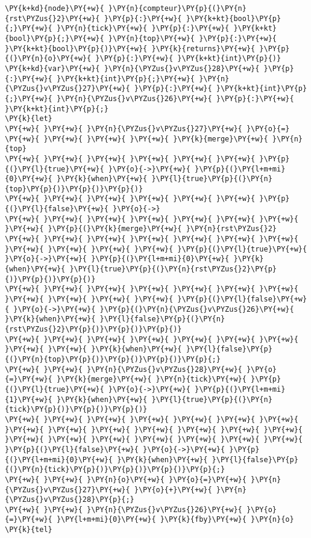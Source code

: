 \begin{Verbatim}[commandchars=\\\{\}]
\PY{k+kd}{node}\PY{+w}{ }\PY{n}{compteur}\PY{p}{(}\PY{n}{rst\PYZus{}2}\PY{+w}{ }\PY{p}{:}\PY{+w}{ }\PY{k+kt}{bool}\PY{p}{;}\PY{+w}{ }\PY{n}{tick}\PY{+w}{ }\PY{p}{:}\PY{+w}{ }\PY{k+kt}{bool}\PY{p}{;}\PY{+w}{ }\PY{n}{top}\PY{+w}{ }\PY{p}{:}\PY{+w}{ }\PY{k+kt}{bool}\PY{p}{)}\PY{+w}{ }\PY{k}{returns}\PY{+w}{ }\PY{p}{(}\PY{n}{o}\PY{+w}{ }\PY{p}{:}\PY{+w}{ }\PY{k+kt}{int}\PY{p}{)}
\PY{k+kd}{var}\PY{+w}{ }\PY{n}{\PYZus{}v\PYZus{}28}\PY{+w}{ }\PY{p}{:}\PY{+w}{ }\PY{k+kt}{int}\PY{p}{;}\PY{+w}{ }\PY{n}{\PYZus{}v\PYZus{}27}\PY{+w}{ }\PY{p}{:}\PY{+w}{ }\PY{k+kt}{int}\PY{p}{;}\PY{+w}{ }\PY{n}{\PYZus{}v\PYZus{}26}\PY{+w}{ }\PY{p}{:}\PY{+w}{ }\PY{k+kt}{int}\PY{p}{;}
\PY{k}{let}
\PY{+w}{ }\PY{+w}{ }\PY{n}{\PYZus{}v\PYZus{}27}\PY{+w}{ }\PY{o}{=}
\PY{+w}{ }\PY{+w}{ }\PY{+w}{ }\PY{+w}{ }\PY{k}{merge}\PY{+w}{ }\PY{n}{top}
\PY{+w}{ }\PY{+w}{ }\PY{+w}{ }\PY{+w}{ }\PY{+w}{ }\PY{+w}{ }\PY{p}{(}\PY{l}{true}\PY{+w}{ }\PY{o}{->}\PY{+w}{ }\PY{p}{(}\PY{l+m+mi}{0}\PY{+w}{ }\PY{k}{when}\PY{+w}{ }\PY{l}{true}\PY{p}{(}\PY{n}{top}\PY{p}{)}\PY{p}{)}\PY{p}{)}
\PY{+w}{ }\PY{+w}{ }\PY{+w}{ }\PY{+w}{ }\PY{+w}{ }\PY{+w}{ }\PY{p}{(}\PY{l}{false}\PY{+w}{ }\PY{o}{->}
\PY{+w}{ }\PY{+w}{ }\PY{+w}{ }\PY{+w}{ }\PY{+w}{ }\PY{+w}{ }\PY{+w}{ }\PY{+w}{ }\PY{p}{(}\PY{k}{merge}\PY{+w}{ }\PY{n}{rst\PYZus{}2}
\PY{+w}{ }\PY{+w}{ }\PY{+w}{ }\PY{+w}{ }\PY{+w}{ }\PY{+w}{ }\PY{+w}{ }\PY{+w}{ }\PY{+w}{ }\PY{+w}{ }\PY{+w}{ }\PY{p}{(}\PY{l}{true}\PY{+w}{ }\PY{o}{->}\PY{+w}{ }\PY{p}{(}\PY{l+m+mi}{0}\PY{+w}{ }\PY{k}{when}\PY{+w}{ }\PY{l}{true}\PY{p}{(}\PY{n}{rst\PYZus{}2}\PY{p}{)}\PY{p}{)}\PY{p}{)}
\PY{+w}{ }\PY{+w}{ }\PY{+w}{ }\PY{+w}{ }\PY{+w}{ }\PY{+w}{ }\PY{+w}{ }\PY{+w}{ }\PY{+w}{ }\PY{+w}{ }\PY{+w}{ }\PY{p}{(}\PY{l}{false}\PY{+w}{ }\PY{o}{->}\PY{+w}{ }\PY{p}{(}\PY{n}{\PYZus{}v\PYZus{}26}\PY{+w}{ }\PY{k}{when}\PY{+w}{ }\PY{l}{false}\PY{p}{(}\PY{n}{rst\PYZus{}2}\PY{p}{)}\PY{p}{)}\PY{p}{)}
\PY{+w}{ }\PY{+w}{ }\PY{+w}{ }\PY{+w}{ }\PY{+w}{ }\PY{+w}{ }\PY{+w}{ }\PY{+w}{ }\PY{+w}{ }\PY{k}{when}\PY{+w}{ }\PY{l}{false}\PY{p}{(}\PY{n}{top}\PY{p}{)}\PY{p}{)}\PY{p}{)}\PY{p}{;}
\PY{+w}{ }\PY{+w}{ }\PY{n}{\PYZus{}v\PYZus{}28}\PY{+w}{ }\PY{o}{=}\PY{+w}{ }\PY{k}{merge}\PY{+w}{ }\PY{n}{tick}\PY{+w}{ }\PY{p}{(}\PY{l}{true}\PY{+w}{ }\PY{o}{->}\PY{+w}{ }\PY{p}{(}\PY{l+m+mi}{1}\PY{+w}{ }\PY{k}{when}\PY{+w}{ }\PY{l}{true}\PY{p}{(}\PY{n}{tick}\PY{p}{)}\PY{p}{)}\PY{p}{)}
\PY{+w}{ }\PY{+w}{ }\PY{+w}{ }\PY{+w}{ }\PY{+w}{ }\PY{+w}{ }\PY{+w}{ }\PY{+w}{ }\PY{+w}{ }\PY{+w}{ }\PY{+w}{ }\PY{+w}{ }\PY{+w}{ }\PY{+w}{ }\PY{+w}{ }\PY{+w}{ }\PY{+w}{ }\PY{+w}{ }\PY{+w}{ }\PY{+w}{ }\PY{+w}{ }\PY{p}{(}\PY{l}{false}\PY{+w}{ }\PY{o}{->}\PY{+w}{ }\PY{p}{(}\PY{l+m+mi}{0}\PY{+w}{ }\PY{k}{when}\PY{+w}{ }\PY{l}{false}\PY{p}{(}\PY{n}{tick}\PY{p}{)}\PY{p}{)}\PY{p}{)}\PY{p}{;}
\PY{+w}{ }\PY{+w}{ }\PY{n}{o}\PY{+w}{ }\PY{o}{=}\PY{+w}{ }\PY{n}{\PYZus{}v\PYZus{}27}\PY{+w}{ }\PY{o}{+}\PY{+w}{ }\PY{n}{\PYZus{}v\PYZus{}28}\PY{p}{;}
\PY{+w}{ }\PY{+w}{ }\PY{n}{\PYZus{}v\PYZus{}26}\PY{+w}{ }\PY{o}{=}\PY{+w}{ }\PY{l+m+mi}{0}\PY{+w}{ }\PY{k}{fby}\PY{+w}{ }\PY{n}{o}
\PY{k}{tel}
\end{Verbatim}
